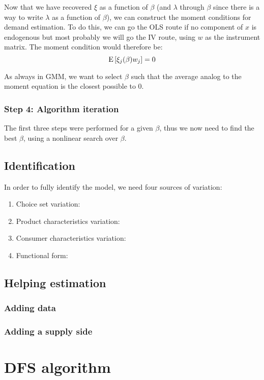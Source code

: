 Now that we have recovered $\xi$ as a function of $\beta$ (and $\lambda$ through $\beta$ since there is a way to write $\lambda$ as a function of $\beta$), we can construct the moment conditions for demand estimation. To do this, we can go the OLS route if no component of $x$ is endogenous but most probably we will go the IV route, using $w$ as the instrument matrix. The moment condition would therefore be: $$ \operatorname{E}\left[\xi_j(\beta) w_j\right] = 0 $$

As always in GMM, we want to select $\beta$ such that the average analog to the moment equation is the closest possible to 0.

\subsubsection{Step 4: Algorithm iteration}

The first three steps were performed for a given $\beta$, thus we now need to find the best $\beta$, using a nonlinear search over $\beta$.

\subsection{Identification}

In order to fully identify the model, we need four sources of variation:\begin{enumerate}
\item Choice set variation:
\item Product characteristics variation:
\item Consumer characteristics variation:
\item Functional form:
\end{enumerate}

\subsection{Helping estimation}

\subsubsection{Adding data}



\subsubsection{Adding a supply side}



\section{DFS algorithm}


